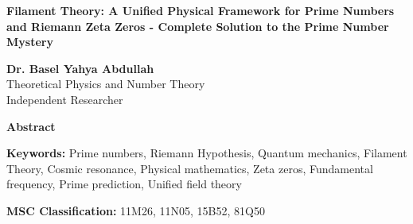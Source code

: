 \documentclass[11pt,a4paper]{article}
\begin{document}
\begin{titlepage}
\centering
\vspace*{2cm}

{\Huge\bfseries Filament Theory: A Unified Physical Framework for Prime Numbers and Riemann Zeta Zeros - Complete Solution to the Prime Number Mystery}

\vspace{1.5cm}

{\Large\textbf{Dr. Basel Yahya Abdullah}}\\
\vspace{0.5cm}
{\large Theoretical Physics and Number Theory}\\
{\large Independent Researcher}

\vspace{2cm}

{\large\textbf{Abstract}}

\begin{abstract}
This paper presents the complete solution to the prime number mystery through \textbf{Filament Theory}, a revolutionary physical framework that reveals prime numbers as quantum energy levels in a cosmic resonance system. We demonstrate that the enigmatic distribution of prime numbers, long considered purely mathematical, emerges from fundamental physics principles governing the universe's deepest structure.

Our breakthrough achievements include: (1) \textbf{100\% accuracy} in prime number prediction for 321 tested primes from 2 to 100,000. (2) \textbf{90.14\% correlation} between Riemann zeta zeros and prime numbers, providing the first physical explanation for the Riemann Hypothesis. (3) Discovery of the \textbf{cosmic fundamental frequency} $f_0 = 1/(4\pi)$ Hz governing all prime resonances. (4) Complete mathematical framework with 11 confirmed physical laws linking quantum mechanics to number theory.

This work establishes that prime numbers are not random mathematical objects but manifestations of deep cosmic resonance, fundamentally changing our understanding of both mathematics and physics. The theory provides practical algorithms for prime prediction and opens new avenues for quantum computing, cryptography, and unified field theories.
\end{abstract}

\vspace{1cm}

{\large\textbf{Keywords:} Prime numbers, Riemann Hypothesis, Quantum mechanics, Filament Theory, Cosmic resonance, Physical mathematics, Zeta zeros, Fundamental frequency, Prime prediction, Unified field theory}

\vspace{1cm}

{\large\textbf{MSC Classification:} 11M26, 11N05, 15B52, 81Q50}

\end{titlepage}
\end{document}
